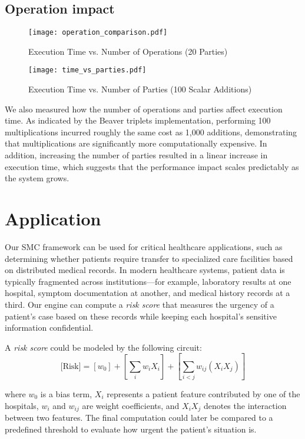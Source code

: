 \documentclass[10pt,conference,compsocconf]{IEEEtran}
\begin{document}
\subsection{Operation impact}
\begin{figure}[H]
    \centering
    \texttt{[image: operation\_comparison.pdf]}
    \caption{\small {Execution Time vs. Number of Operations (20 Parties)}}
    \label{fig:enter-label}
\end{figure}
\begin{figure}[H]
    \centering
    \texttt{[image: time\_vs\_parties.pdf]}
    \caption{\small {Execution Time vs. Number of Parties (100 Scalar Additions) }}
    \label{fig:enter-label}
\end{figure}

We also measured how the number of operations and parties affect execution time. As indicated by the Beaver triplets implementation, performing 100 multiplications incurred roughly the same cost as 1,000 additions, demonstrating that multiplications are significantly more computationally expensive. In addition, increasing the number of parties resulted in a linear increase in execution time, which suggests that the performance impact scales predictably as the system grows.

\section{Application}

Our SMC framework can be used for critical healthcare applications, such as determining whether patients require transfer to specialized care facilities based on distributed medical records. In modern healthcare systems, patient data is typically fragmented across institutions—for example, laboratory results at one hospital, symptom documentation at another, and medical history records at a third. Our engine can compute a \textit{risk score} that measures the urgency of a patient's case based on these records while keeping each hospital's sensitive information confidential.

A \textit{risk score} could be modeled by the following circuit:
\begin{equation*}
\text{[Risk]} = [w_0] + [\sum_{i} w_i X_i] + [\sum_{i<j} w_{ij}(X_iX_j)] 
\end{equation*}

where \(w_0\) is a bias term, \(X_i\) represents a patient feature contributed by one of the hospitals, \(w_i\) and \(w_{ij}\) are weight coefficients, and \(X_iX_j\) denotes the interaction between two features. The final computation could later be compared to a predefined threshold to evaluate how urgent the patient's situation is.
\end{document}
